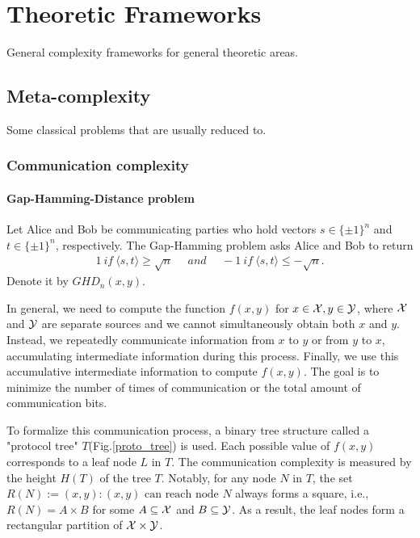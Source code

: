 \chapter{Theoretic Frameworks}
General complexity frameworks for general theoretic areas.


\section{Meta-complexity}
Some classical problems that are usually reduced to.
\subsection{Communication complexity}
\subsubsection{Gap-Hamming-Distance problem}
\begin{prob}
\label{ghd}
     Let Alice and Bob be communicating parties who hold vectors $s\in\{\pm1\}^n$ and $t\in\{\pm1\}^n$, respectively. The Gap-Hamming problem asks Alice and Bob to return
     \begin{align*}
         1~if~\langle s,t \rangle\ge \sqrt{n}~~~~~~and~~~~~~-1~if~\langle s,t \rangle\le -\sqrt{n}.
     \end{align*}
     Denote it by $GHD_{n}(x,y)$.
\end{prob}



In general, we need to compute the function $f(x,y)$ for $x\in \mathcal{X}, y\in\mathcal{Y}$, where $\mathcal{X}$ and $\mathcal{Y}$ are separate sources and we cannot simultaneously obtain both $x$ and $y$. Instead, we repeatedly communicate information from $x$ to $y$ or from $y$ to $x$, accumulating intermediate information during this process. Finally, we use this accumulative intermediate information to compute $f(x,y)$. The goal is to minimize the number of times of communication or the total amount of communication bits.

To formalize this communication process, a binary tree structure called a "protocol tree" $T$(Fig.\ref{proto_tree}) is used. Each possible value of $f(x,y)$ corresponds to a leaf node $L$ in $T$. The communication complexity is measured by the height $H(T)$ of the tree $T$. Notably, for any node $N$ in $T$, the set $R(N):={(x,y):(x,y)\text{ can reach node $N$}}$ always forms a square, i.e., $R(N)=A\times B$ for some $A\subseteq\mathcal{X}$ and $B\subseteq\mathcal{Y}$. As a result, the leaf nodes form a rectangular partition of $\mathcal{X}\times\mathcal{Y}$.

